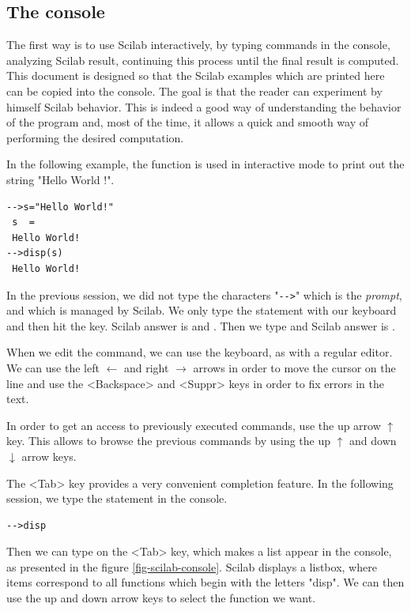 \subsection{The console}
The first way is to use Scilab interactively, by typing commands
in the console, analyzing Scilab result, continuing this 
process until the final result is computed. 
This document is designed so that the Scilab examples 
which are printed here can be copied into the console. 
The goal is that the reader can experiment by himself Scilab behavior. 
This is indeed a good way of understanding the behavior of the program and,
most of the time, it allows a quick and smooth way of performing the 
desired computation.

In the following example, the function  is 
used in interactive mode to print out the string "Hello World !".
\lstset{language=scilabscript}
\begin{lstlisting}
-->s="Hello World!"
 s  =
 Hello World!   
-->disp(s)
 Hello World!   
\end{lstlisting}

In the previous session, we did not type the characters "\verb|-->|" which 
is the \emph{prompt}, and which is managed by Scilab.
We only type the statement  with our keyboard
and then hit the  key. Scilab answer is 
and . Then we type  and 
Scilab answer is .

When we edit the command, we can use the keyboard, as with a 
regular editor. We can use the left $\leftarrow$ and right $\rightarrow$ arrows
in order to move the cursor on the line and use the <Backspace> and <Suppr> keys
in order to fix errors in the text.

In order to get an access to previously executed commands, 
use the up arrow $\uparrow$ key. This allows to browse the previous 
commands by using the up $\uparrow$ and down $\downarrow$ arrow keys. 

The <Tab> key provides a very convenient completion feature. 
In the following session, we type the statement  in the console.
\lstset{language=scilabscript}
\begin{lstlisting}
-->disp
\end{lstlisting}

Then we can type on the <Tab> key, which makes a list appear in the 
console, as presented in the figure \ref{fig-scilab-console}.
Scilab displays a listbox, where items correspond to all functions
which begin with the letters "disp". 
We can then use the up and down arrow keys to select the function 
we want.

